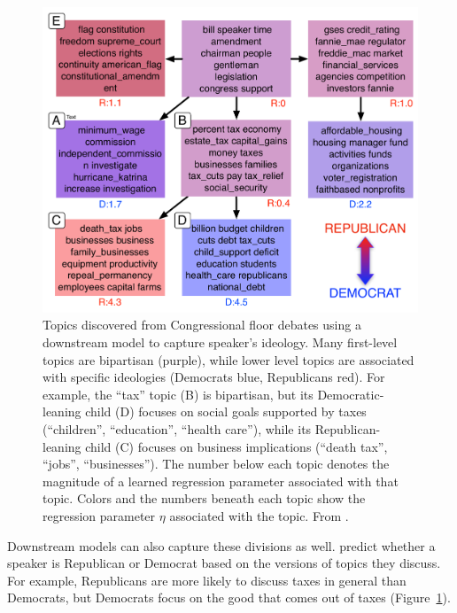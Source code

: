 \begin{figure}[ht]
  \begin{minipage}[c]{0.62\textwidth}
  	\vspace{-.3cm}
    \includegraphics[width=\textwidth]{figures/ideology_topics_vert}
  \end{minipage}\hfill
  \begin{minipage}[c]{0.36\textwidth}
    \caption{
       \small Topics discovered from Congressional floor debates using
       a downstream model to capture speaker's ideology.  Many
    first-level topics are bipartisan (purple), while lower level topics are
    associated with specific ideologies (Democrats blue, Republicans red). For example,
    	the ``tax'' topic (B) is bipartisan, but its Democratic-leaning child (D) focuses on
    	social goals supported by taxes (``children'', ``education'', ``health care''), while
    	its Republican-leaning child (C) focuses on business implications (``death tax'', ``jobs'',
    	``businesses'').  The number below each
    topic denotes the magnitude of a learned regression parameter associated
    with that topic.  Colors and the numbers beneath each topic show the
    regression parameter $\eta$ associated with the topic.  From \citet{nguyen-13:shlda}.
    } \label{fig:shlda-taxes}
  \end{minipage}
  \vspace{-.3cm}
\end{figure}


Downstream models can also capture these divisions as well.
\citet{nguyen-13:shlda} predict whether a speaker is Republican or
Democrat based on the versions of topics they discuss.  For example,
Republicans are more likely to discuss taxes in general than
Democrats, but Democrats focus on the good that comes out of taxes
(Figure~\ref{fig:shlda-taxes}).

